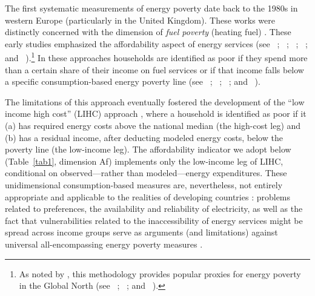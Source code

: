 \documentclass[11pt, a4paper]{article}
\newcommand{\citealp}[1]{\citeauthor{#1}~\citeyear{#1}}
\begin{document}
The first systematic measurements of energy poverty date back to the 1980s in western Europe (particularly in the United Kingdom). These works were distinctly concerned with the dimension of \textit{fuel poverty} (heating fuel) \parencite{li2014, sovacool2015, day2016, primc2021}. These early studies emphasized the affordability aspect of energy services (see \citealp{bradshaw1983}; \citealp{krugmann1983}; \citealp{leach1987}; \citealp{goldemberg1995}; and \citealp{boardman1991}).\footnote{As noted by \textcite{soriano-hernandez2022}, this methodology provides popular proxies for energy poverty in the Global North (see \citealp{balaskas2021}; \citealp{tundys2021}; and \citealp{das2022}).} In these approaches households are identified as poor if they spend more than a certain share of their income on fuel services or if that income falls below a specific consumption-based energy poverty line (see \citealp{thomson2017}; \citealp{thomson2017b}; \citealp{awaworyichurchill2020}; and \citealp{awaworyichurchill2020a}). 

The limitations of this approach eventually fostered the development of the  ``low income high cost'' (LIHC) approach \parencite{hills2011, hills2012}, where a household is identified as poor if it (a) has required energy costs above the national median (the high-cost leg) and (b) has a residual income, after deducting modeled energy costs, below the poverty line (the low-income leg). The affordability indicator we adopt below (Table~\ref{tab1}, dimension Af) implements only the low-income leg of LIHC, conditional on observed---rather than modeled---energy expenditures. These unidimensional consumption-based measures are, nevertheless, not entirely appropriate and applicable to the realities of developing countries \parencite{sy2022a, li2014, rafi2021}: problems related to preferences, the availability and reliability of electricity, as well as the fact that vulnerabilities related to the inaccessibility of energy services might be spread across income groups serve as arguments (and limitations) against universal all-encompassing energy poverty measures \parencite{akpalu2011, barnes2011, barnes2010, hiemstra-vanderhorst2008, leach1992}. 
\end{document}
